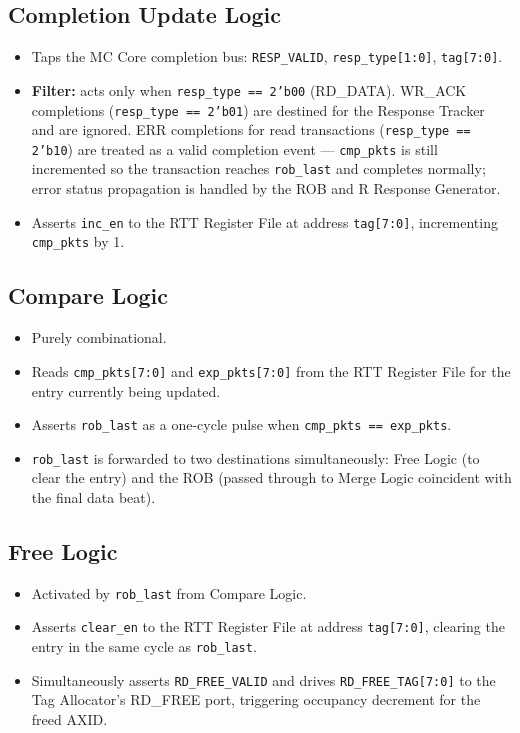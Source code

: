 \subsection{Completion Update Logic}

\begin{itemize}
  \item Taps the MC Core completion bus: \texttt{RESP\_VALID},
        \texttt{resp\_type[1:0]}, \texttt{tag[7:0]}.
  \item \textbf{Filter:} acts only when \texttt{resp\_type == 2'b00}
        (RD\_DATA). WR\_ACK completions (\texttt{resp\_type == 2'b01})
        are destined for the Response Tracker and are ignored. ERR
        completions for read transactions (\texttt{resp\_type == 2'b10})
        are treated as a valid completion event — \texttt{cmp\_pkts} is
        still incremented so the transaction reaches \texttt{rob\_last}
        and completes normally; error status propagation is handled by
        the ROB and R Response Generator.
  \item Asserts \texttt{inc\_en} to the RTT Register File at address
        \texttt{tag[7:0]}, incrementing \texttt{cmp\_pkts} by 1.
\end{itemize}

\subsection{Compare Logic}

\begin{itemize}
  \item Purely combinational.
  \item Reads \texttt{cmp\_pkts[7:0]} and \texttt{exp\_pkts[7:0]} from
        the RTT Register File for the entry currently being updated.
  \item Asserts \texttt{rob\_last} as a one-cycle pulse when
        \texttt{cmp\_pkts == exp\_pkts}.
  \item \texttt{rob\_last} is forwarded to two destinations
        simultaneously: Free Logic (to clear the entry) and the ROB
        (passed through to Merge Logic coincident with the final data
        beat).
\end{itemize}

\subsection{Free Logic}

\begin{itemize}
  \item Activated by \texttt{rob\_last} from Compare Logic.
  \item Asserts \texttt{clear\_en} to the RTT Register File at address
        \texttt{tag[7:0]}, clearing the entry in the same cycle as
        \texttt{rob\_last}.
  \item Simultaneously asserts \texttt{RD\_FREE\_VALID} and drives
        \texttt{RD\_FREE\_TAG[7:0]} to the Tag Allocator's RD\_FREE
        port, triggering occupancy decrement for the freed AXID.
\end{itemize}

